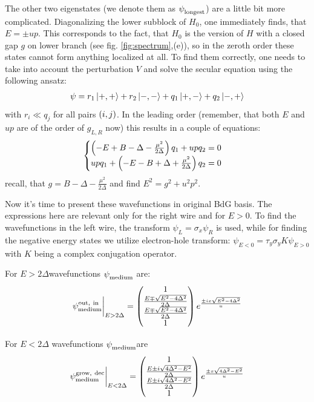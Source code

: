 The other two eigenstates (we denote them as $ \psi_{\mathrm{longest}}^{\mathrm{}}$) are a little bit more complicated. Diagonalizing  the lower subblock of $ H_0 $, one immediately finds, that $ E=\pm up $. This corresponds to the fact, that $ H_0 $ is the version of $ H $ with a closed gap $ g $  on lower branch (see fig. \ref{fig:spectrum},(e)), so in the zeroth order these states cannot form anything localized at all. To find them correctly, one needs to take into account the perturbation $ V $ and solve the secular equation using the following ansatz:
\begin{gather}
	\psi = r_1\ket{+, + }+r_2\ket{-, - }+q_{1}\ket{+, - }+q_{2}\ket{-, + }
\end{gather}
with $ r_i\ll q_j $ for all  pairs $ \left(i,j\right) $. In the leading order (remember, that both $ E  $ and $ up $ are of the order of $ g_{L,R} $ now) this results in a couple of equations:
\begin{gather}
\begin{cases}
	\left(-E+B-\Delta-\frac{\mu^2}{2\Delta}\right)q_1+up q_2=0
	\\
	u p q_1 + \left(-E-B+\Delta+\frac{\mu^2}{2\Delta}\right)q_2 =0
\end{cases}
\end{gather}
recall, that $ g=B-\Delta-\frac{\mu^2}{2\Delta} $ and find $ E^2=g^2+u^2p^2 $.


Now it's time to present these wavefunctions in original BdG basis. The expressions here are relevant only for the right wire and for $ E>0 $. To find the wavefunctions in the left wire, the transform $ \psi_L=\sigma_x\psi_R $ is used, while for finding the negative energy states we utilize electron-hole transform: $ \psi_{E<0}= \tau_y\sigma_yK\psi_{E>0}$ with $ K $ being a complex conjugation operator.

For $ E>2\Delta $wavefunctions $ \psi_{\mathrm{medium}}^{\mathrm{}}	 $ are:
\begin{gather}
\label{medium_prop_wave_functions}
	\psi_{\mathrm{medium}}^{\mathrm{out,~in}}
	\bigg|_{E>2\Delta}
	=
	\begin{pmatrix}
	1
	\\
	\frac{E\mp\sqrt{E^2-4\Delta^2}}{2\Delta}
	\\
	\frac{E\mp\sqrt{E^2-4\Delta^2}}{2\Delta}
	\\
	1
	\end{pmatrix}
	e^\frac{\pm i x\sqrt{E^2-4\Delta^2}}{u}
	\end{gather}
	
	For $ E<2\Delta $  wavefunctions $ \psi_{\mathrm{medium}}^{\mathrm{}}	 $are
	\begin{gather}
	\label{medium_dec_wave_functions}
	\psi_{\mathrm{medium}}^{\mathrm{grow,~dec}}
	\bigg|_{E<2\Delta}
	=
	\begin{pmatrix}
	1
	\\
	\frac{E\pm i\sqrt{4\Delta^2-E^2}}{2\Delta}
	\\
	\frac{E\pm i\sqrt{4\Delta^2-E^2}}{2\Delta}
	\\
	1
	\end{pmatrix}
	e^\frac{\pm  x\sqrt{4\Delta^2-E^2}}{u}
\end{gather}

